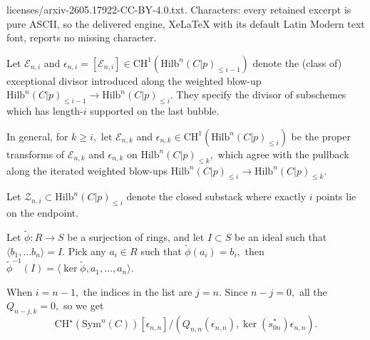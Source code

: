 \documentclass[10pt,a4paper]{amsart}
\newcommand{\Hilb}{\mathrm{Hilb}}
\newcommand{\cE}{\mathcal{E}}
\begin{document}
licenses/arxiv-2605.17922-CC-BY-4.0.txt. Characters: every retained excerpt is pure ASCII, so the delivered engine, XeLaTeX with its default Latin Modern text font, reports no missing character.
\begin{definition}\label{def: doubleindexes}
     Let $\cE_{n,i}$ and $\epsilon_{n,i}=[\cE_{n,i}]\in \mathrm{CH}^1(\Hilb^n(C|p)_{\leq i-1})$ denote the (class of) exceptional divisor introduced along the weighted blow-up $\Hilb^n(C|p)_{\leq i-1}\to \Hilb^n(C|p)_{\leq i}.$ They specify the divisor of subschemes which has length-$i$ supported on the last bubble. 
    
    In general, for $k \geq i,$ let $\cE_{n,k}$ and $\epsilon_{n,k}\in \mathrm{CH}^1(\Hilb^n(C|p)_{\leq i})$ be the proper transforms of $\cE_{n,k}$ and $\epsilon_{n,k}$ on $\Hilb^n(C|p)_{\leq k},$ which agree with the pullback along the iterated weighted blow-ups $\Hilb^n(C|p)_{\leq i}\to \Hilb^n(C|p)_{\leq k}.$

    Let $\mathcal{Z}_{n,i}\subset \Hilb^{n}(C|p)_{\leq i}$ denote the closed substack where exactly $i$ points lie on the endpoint.
\end{definition}

\begin{lemma}\label{lem:rings}
  Let $\tilde{\phi}: R\to S$ be a surjection of rings, and let $I\subset S$ be an ideal such that $\langle b_1,\dots b_n\rangle = I.$ Pick any $a_i\in R$ such that $\tilde{\phi}(a_i) = b_i,$ then $\tilde{\phi}^{-1}(I) = \langle \ker \tilde{\phi}, a_1,\dots,a_n\rangle.$
\end{lemma}

\begin{example}
  When $i = n-1,$ the indices in the list are $j = n.$ Since $n-j = 0,$ all the $Q_{n-j,k}=0,$ so we get $$\mathrm{CH}^\star(\mathrm{Sym}^n(C))[\epsilon_{n,n}]/(Q_{n,n}(\epsilon_{n,n}),\ker (s_{0n}^*)\epsilon_{n,n}).$$
\end{example}
\end{document}
